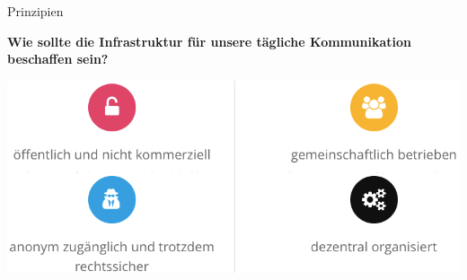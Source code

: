 \documentclass[10pt]{beamer}
\begin{document}
    \begin{frame}{Prinzipien}
      \begin{centering}
        \large{\textbf{Wie sollte die Infrastruktur für unsere tägliche Kommunikation beschaffen sein?}}
      \end{centering}
      \pause
      \vfill
      \includegraphics[width=1.1\textheight]{images/principles}
    \end{frame}
\end{document}
